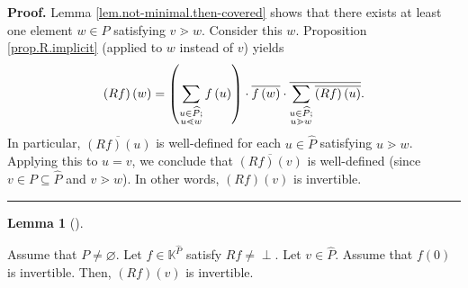 \documentclass[numbers=enddot,12pt,final,onecolumn,notitlepage]{scrartcl}%
\theoremstyle{definition}
\newtheorem{lem}[theo]{Lemma}
\newenvironment{lemma}[1][]
{\begin{lem}[#1]\begin{leftbar}}
{\end{leftbar}\end{lem}}
\newcommand{\undf}{\operatorname*{\bot}}
\newenvironment{proof}[1][Proof]{\noindent\textbf{#1.} }{\ \rule{0.5em}{0.5em}}
\let\sumnonlimits\sum
\renewcommand{\sum}{\sumnonlimits\limits}
\begin{document}
\begin{proof}
Lemma \ref{lem.not-minimal.then-covered} shows that there exists at least one
element $w\in P$ satisfying $v\gtrdot w$. Consider this $w$. Proposition
\ref{prop.R.implicit} (applied to $w$ instead of $v$) yields%
\[
\left(  Rf\right)  \left(  w\right)  =\left(  \sum\limits_{\substack{u\in
\widehat{P};\\u\lessdot w}}f\left(  u\right)  \right)  \cdot\overline{f\left(
w\right)  }\cdot\overline{\sum\limits_{\substack{u\in\widehat{P};\\u\gtrdot
w}}\overline{\left(  Rf\right)  \left(  u\right)  }}.
\]
In particular, $\overline{\left(  Rf\right)  \left(  u\right)  }$ is
well-defined for each $u\in\widehat{P}$ satisfying $u\gtrdot w$. Applying this
to $u=v$, we conclude that $\overline{\left(  Rf\right)  \left(  v\right)  }$
is well-defined (since $v\in P\subseteq\widehat{P}$ and $v\gtrdot w$). In
other words, $\left(  Rf\right)  \left(  v\right)  $ is invertible.
\end{proof}

\begin{lemma}
\label{lem.R.inv-2}Assume that $P\neq\varnothing$. Let $f\in\mathbb{K}%
^{\widehat{P}}$ satisfy $Rf\neq\undf$. Let $v\in\widehat{P}$. Assume that
$f\left(  0\right)  $ is invertible. Then, $\left(  Rf\right)  \left(
v\right)  $ is invertible.
\end{lemma}
\end{document}
